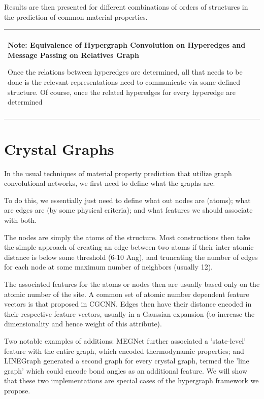 \documentclass{article}
\newenvironment{boxed2}
    {\begin{center}
    \begin{tabular}{|p{0.45\textwidth}|}
    \hline\\
    }
    { 
    \\\\\hline
    \end{tabular} 
    \end{center}
    }
\begin{document}
Results are then presented for different combinations of orders of structures in the prediction of common material properties.


\begin{boxed2}
    \textbf{Note: Equivalence of Hypergraph Convolution on Hyperedges and Message Passing on Relatives Graph} 

    \medskip
    
    Once the relations between hyperedges are determined, all that needs to be done is the relevant representations need to communicate via some defined structure. Of course, once the related hyperedges for every hyperedge are determined 
\end{boxed2}


\section{Crystal Graphs}
In the usual techniques of material property prediction that utilize graph convolutional networks, we first need to define what the graphs are.

To do this, we essentially just need to define what out nodes are (atoms); what are edges are (by some physical criteria); and what features we should associate with both. 

The nodes are simply the atoms of the structure. 
Most constructions then take the simple approach of creating an edge between two atoms if their inter-atomic distance is below some threshold (6-10 Ang), and  truncating the number of edges for each node at some maximum number of neighbors (usually 12). 

The associated features for the atoms or nodes then are usually based only on the atomic number of the site. A common set of atomic number dependent feature vectors is that proposed in CGCNN. 
Edges then have their distance encoded in their respective feature vectors, usually in a Gaussian expansion (to increase the dimensionality and hence weight of this attribute).
\begin{center}

\end{center}
Two notable examples of additions: MEGNet further associated a 'state-level' feature with the entire graph, which encoded thermodynamic properties; and LINEGraph generated a second graph for every crystal graph, termed the 'line graph' which could encode bond angles as an additional feature. We will show that these two implementations are special cases of the hypergraph framework we propose.
\end{document}
